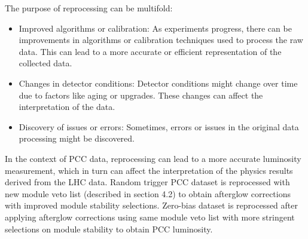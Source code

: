 
The purpose of reprocessing can be multifold:

\begin{itemize}
  
\item Improved algorithms or calibration: As experiments progress, there can be improvements in algorithms or calibration techniques used to process the raw data. This can lead to a more accurate or efficient representation of the collected data.

\item Changes in detector conditions: Detector conditions might change over time due to factors like aging or upgrades. These changes can affect the interpretation of the data.

\item Discovery of issues or errors: Sometimes, errors or issues in the original data processing might be discovered.

\end{itemize}
  
In the context of PCC data, reprocessing can lead to a more accurate luminosity measurement, which in turn can affect the interpretation of the physics results derived from the LHC data. Random trigger PCC dataset is reprocessed with new module veto list (described in section 4.2) to obtain afterglow corrections with improved module stability selections. Zero-bias dataset is reprocessed after applying afterglow corrections using same module veto list with more stringent selections on module stability to obtain PCC luminosity.

